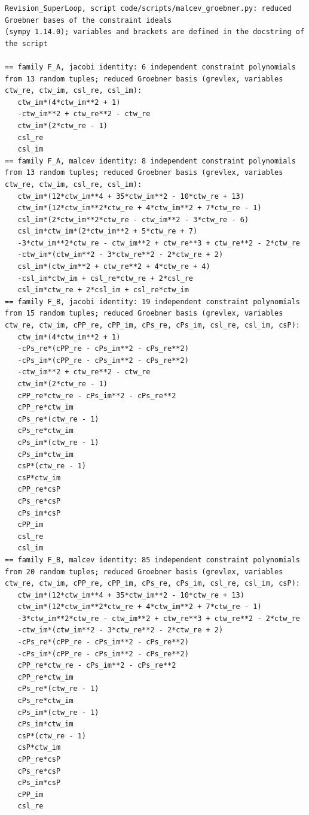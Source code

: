 \documentclass[
  10pt,
]{article}
\begin{document}
\begin{verbatim}
Revision_SuperLoop, script code/scripts/malcev_groebner.py: reduced Groebner bases of the constraint ideals
(sympy 1.14.0); variables and brackets are defined in the docstring of the script

== family F_A, jacobi identity: 6 independent constraint polynomials from 13 random tuples; reduced Groebner basis (grevlex, variables ctw_re, ctw_im, csl_re, csl_im):
   ctw_im*(4*ctw_im**2 + 1)
   -ctw_im**2 + ctw_re**2 - ctw_re
   ctw_im*(2*ctw_re - 1)
   csl_re
   csl_im
== family F_A, malcev identity: 8 independent constraint polynomials from 13 random tuples; reduced Groebner basis (grevlex, variables ctw_re, ctw_im, csl_re, csl_im):
   ctw_im*(12*ctw_im**4 + 35*ctw_im**2 - 10*ctw_re + 13)
   ctw_im*(12*ctw_im**2*ctw_re + 4*ctw_im**2 + 7*ctw_re - 1)
   csl_im*(2*ctw_im**2*ctw_re - ctw_im**2 - 3*ctw_re - 6)
   csl_im*ctw_im*(2*ctw_im**2 + 5*ctw_re + 7)
   -3*ctw_im**2*ctw_re - ctw_im**2 + ctw_re**3 + ctw_re**2 - 2*ctw_re
   -ctw_im*(ctw_im**2 - 3*ctw_re**2 - 2*ctw_re + 2)
   csl_im*(ctw_im**2 + ctw_re**2 + 4*ctw_re + 4)
   -csl_im*ctw_im + csl_re*ctw_re + 2*csl_re
   csl_im*ctw_re + 2*csl_im + csl_re*ctw_im
== family F_B, jacobi identity: 19 independent constraint polynomials from 15 random tuples; reduced Groebner basis (grevlex, variables ctw_re, ctw_im, cPP_re, cPP_im, cPs_re, cPs_im, csl_re, csl_im, csP):
   ctw_im*(4*ctw_im**2 + 1)
   -cPs_re*(cPP_re - cPs_im**2 - cPs_re**2)
   -cPs_im*(cPP_re - cPs_im**2 - cPs_re**2)
   -ctw_im**2 + ctw_re**2 - ctw_re
   ctw_im*(2*ctw_re - 1)
   cPP_re*ctw_re - cPs_im**2 - cPs_re**2
   cPP_re*ctw_im
   cPs_re*(ctw_re - 1)
   cPs_re*ctw_im
   cPs_im*(ctw_re - 1)
   cPs_im*ctw_im
   csP*(ctw_re - 1)
   csP*ctw_im
   cPP_re*csP
   cPs_re*csP
   cPs_im*csP
   cPP_im
   csl_re
   csl_im
== family F_B, malcev identity: 85 independent constraint polynomials from 20 random tuples; reduced Groebner basis (grevlex, variables ctw_re, ctw_im, cPP_re, cPP_im, cPs_re, cPs_im, csl_re, csl_im, csP):
   ctw_im*(12*ctw_im**4 + 35*ctw_im**2 - 10*ctw_re + 13)
   ctw_im*(12*ctw_im**2*ctw_re + 4*ctw_im**2 + 7*ctw_re - 1)
   -3*ctw_im**2*ctw_re - ctw_im**2 + ctw_re**3 + ctw_re**2 - 2*ctw_re
   -ctw_im*(ctw_im**2 - 3*ctw_re**2 - 2*ctw_re + 2)
   -cPs_re*(cPP_re - cPs_im**2 - cPs_re**2)
   -cPs_im*(cPP_re - cPs_im**2 - cPs_re**2)
   cPP_re*ctw_re - cPs_im**2 - cPs_re**2
   cPP_re*ctw_im
   cPs_re*(ctw_re - 1)
   cPs_re*ctw_im
   cPs_im*(ctw_re - 1)
   cPs_im*ctw_im
   csP*(ctw_re - 1)
   csP*ctw_im
   cPP_re*csP
   cPs_re*csP
   cPs_im*csP
   cPP_im
   csl_re

\end{verbatim}
\end{document}
